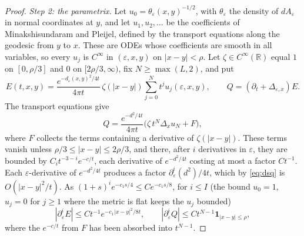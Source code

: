 \documentclass[pdflatex,sn-mathphys-num]{sn-jnl}
\theoremstyle{thmstyleone}%
\theoremstyle{thmstylethree}%
\newcommand{\R}{\mathbb{R}}
\begin{document}
\begin{appendices}
\begin{proof}
\emph{Step 2: the parametrix.} Let $u_0=\theta_\varepsilon(x,y)^{-1/2}$, with $\theta_\varepsilon$ the density of $dA_\varepsilon$ in normal coordinates at $y$, and let $u_1,u_2,\dots$ be the coefficients of Minakshisundaram and Pleijel, defined by the transport equations along the geodesic from $y$ to $x$. These are ODEs whose coefficients are smooth in all variables, so every $u_j$ is $C^\infty$ in $(\varepsilon,x,y)$ on $|x-y|<\rho$. Let $\zeta\in C^\infty(\R)$ equal $1$ on $[0,\rho/3]$ and $0$ on $[2\rho/3,\infty)$, fix $N\ge\max(L,2)$, and put
\[
E(t,x,y)=\frac{e^{-d_\varepsilon(x,y)^2/4t}}{4\pi t}\,\zeta(|x-y|)\sum_{j=0}^Nt^ju_j(\varepsilon,x,y),\qquad Q=(\partial_t+\Delta_{\varepsilon,x})E.
\]
The transport equations give
\[
Q=\frac{e^{-d^2/4t}}{4\pi t}\big(\zeta\,t^N\Delta_xu_N+F\big),
\]
where $F$ collects the terms containing a derivative of $\zeta(|x-y|)$. These terms vanish unless $\rho/3\le|x-y|\le2\rho/3$, and there, after $i$ derivatives in $\varepsilon$, they are bounded by $C_it^{-3-i}e^{-c/t}$, each derivative of $e^{-d^2/4t}$ costing at most a factor $Ct^{-1}$. Each $\varepsilon$-derivative of $e^{-d^2/4t}$ produces a factor $\partial_\varepsilon^i(d^2)/4t$, which by \eqref{eq:dsq} is $O(|x-y|^2/t)$. As $(1+s)^ie^{-c_1s/4}\le C e^{-c_1s/8}$, for $i\le I$ (the bound $u_0=1$, $u_j=0$ for $j\ge1$ where the metric is flat keeps the $u_j$ bounded)
\begin{equation}\label{eq:EQ}
|\partial_\varepsilon^iE|\le Ct^{-1}e^{-c_1|x-y|^2/8t},\qquad|\partial_\varepsilon^iQ|\le Ct^{N-1}\mathbf 1_{|x-y|\le\rho},
\end{equation}
where the $e^{-c/t}$ from $F$ has been absorbed into $t^{N-1}$.


\end{proof}
\end{appendices}
\end{document}
